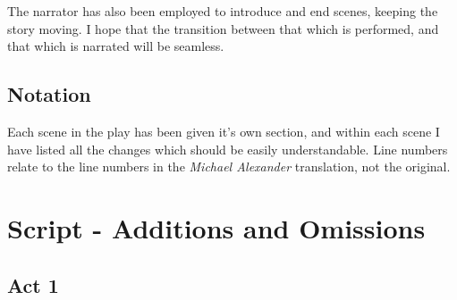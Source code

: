 \documentclass[a4paper]{article}
\begin{document}
The narrator has also been employed to introduce and end scenes, keeping the
story moving. I hope that the transition between that which is performed, and
that which is narrated will be seamless.

\subsection{Notation}%

Each scene in the play has been given it's own section, and within each scene I 
have listed all the changes which should be easily understandable. Line
numbers relate to the line numbers in the \textit{Michael Alexander} translation, not
the original.

\newpage

\section{Script - Additions and Omissions}

\subsection{Act 1}%
\end{document}
